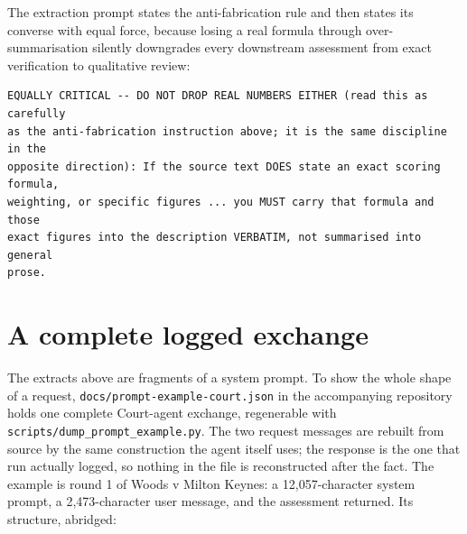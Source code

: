 The extraction prompt states the anti-fabrication rule and then states its
converse with equal force, because losing a real formula through
over-summarisation silently downgrades every downstream assessment from exact
verification to qualitative review:

\begin{lstlisting}
EQUALLY CRITICAL -- DO NOT DROP REAL NUMBERS EITHER (read this as carefully
as the anti-fabrication instruction above; it is the same discipline in the
opposite direction): If the source text DOES state an exact scoring formula,
weighting, or specific figures ... you MUST carry that formula and those
exact figures into the description VERBATIM, not summarised into general
prose.
\end{lstlisting}

\section{A complete logged exchange}
\label{app:json}

The extracts above are fragments of a system prompt. To show the whole shape of a
request, \texttt{docs/prompt-example-court.json} in the accompanying repository
holds one complete Court-agent exchange, regenerable with
\texttt{scripts/dump\_prompt\_example.py}. The two request messages are rebuilt
from source by the same construction the agent itself uses; the response is the one
that run actually logged, so nothing in the file is reconstructed after the fact.
The example is round 1 of Woods v Milton Keynes: a 12{,}057-character system
prompt, a 2{,}473-character user message, and the assessment returned. Its
structure, abridged:

